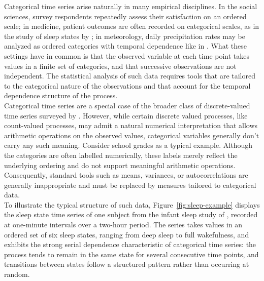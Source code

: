 ﻿\documentclass[12pt,a4paper]{scrreprt}
\theoremstyle{definition}
\begin{document}
Categorical time series arise naturally in many empirical disciplines. 
In the social sciences, survey respondents repeatedly assess their 
satisfaction on an ordered scale; in medicine, patient outcomes are often recorded on categorical scales,
as in the study of sleep states by \citet{Stoffer2000}; in 
meteorology, daily precipitation rates may be analyzed as ordered 
categories with temporal dependence like in \citet{Chang1984}. What these settings have 
in common is that the observed variable at each time point takes 
values in a finite set of categories, and that successive observations 
are not independent. The statistical analysis of such data requires 
tools that are tailored to the categorical nature of the observations 
and that account for the temporal dependence structure of the process. \\
Categorical time series are a special case of the broader class of 
discrete-valued time series surveyed by \citet{Weiss2018}. However, while 
certain discrete valued processes, like count-valued processes, 
may  admit a natural numerical interpretation that 
allows arithmetic operations on the observed values, categorical 
variables generally don't carry any such meaning. Consider school grades 
as a typical example. Although the categories are often labelled numerically, 
these labels merely reflect the underlying ordering and do not support meaningful 
arithmetic operations. Consequently, standard tools such as means, variances, or 
autocorrelations are generally inappropriate and must be replaced by measures tailored to categorical data.\\
To illustrate the typical structure of such data, 
Figure~\ref{fig:sleep-example} displays the sleep state time series 
of one subject from the infant sleep study of \citet{Stoffer2000}, 
recorded at one-minute intervals over a two-hour period. The series 
takes values in an ordered set of six sleep states, ranging from deep 
sleep to full wakefulness, and exhibits the strong serial dependence 
characteristic of categorical time series: the process tends to 
remain in the same state for several consecutive time points, 
and transitions between states follow a structured pattern rather than occurring at random.
\end{document}

